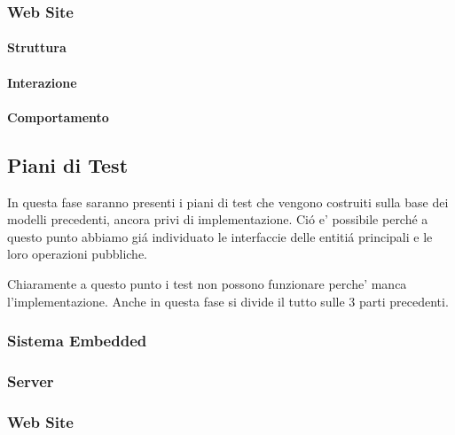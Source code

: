 \subsubsection{Web Site}

\paragraph{Struttura}

\paragraph{Interazione}

\paragraph{Comportamento}

\subsection{Piani di Test}

In questa fase saranno presenti i piani di test che vengono costruiti sulla base dei modelli precedenti, ancora privi di implementazione. Ci\'o e' possibile perch\'e a questo punto abbiamo gi\'a individuato le interfaccie delle entiti\'a principali e le loro operazioni pubbliche.

Chiaramente a questo punto i test non possono funzionare perche' manca l'implementazione. Anche in questa fase si divide il tutto sulle 3 parti precedenti.

\subsubsection{Sistema Embedded}
\subsubsection{Server}
\subsubsection{Web Site}
